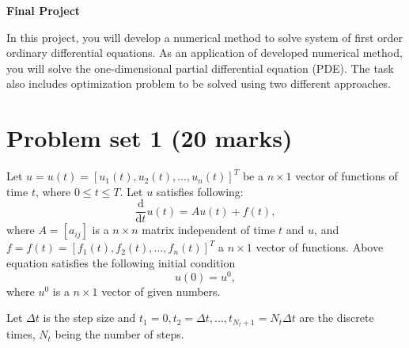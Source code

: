 \documentclass[11pt,a4paper]{article}
\newcommand{\dd}{\mathrm{d}}
\begin{document}
\begin{center} 
\textbf{\Large Final Project} 
\end{center}

In this project, you will develop a numerical method to solve system of first order ordinary differential equations. As an application of developed numerical method, you will solve the one-dimensional partial differential equation (PDE). The task also includes optimization problem to be solved using two different approaches. 

\section{Problem set 1 (20 marks)}
Let $u = u(t) = [u_1(t), u_2(t), ..., u_n(t)]^T$ be a $n\times 1$ vector of functions of time $t$, where $0 \leq t \leq T$. Let $u$ satisfies following:
\begin{equation}\label{eq:ode}
\frac{\dd }{\dd t} u(t) = A u(t) + f(t),
\end{equation}
where $A = [a_{ij}]$ is a $n\times n$ matrix independent of time $t$ and $u$, and $f = f(t) = [f_1(t), f_2(t), ..., f_n(t)]^T$ a $n\times 1$ vector of functions. Above equation satisfies the following initial condition
\begin{equation}\label{eq:odeIC}
u(0) = u^0,
\end{equation}
where $u^0$ is a $n\times 1$ vector of given numbers. 

Let $\Delta t$ is the step size and $t_1 = 0, t_2 = \Delta t, ..., t_{N_t + 1} = N_t \Delta t$ are the discrete times, $N_t$ being the number of steps. 
\end{document}
